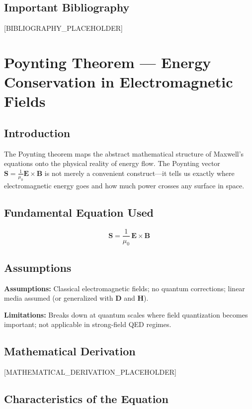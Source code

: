 \documentclass[11pt,openright]{book}
\begin{document}
\section*{Important Bibliography}

[BIBLIOGRAPHY_PLACEHOLDER]


\chapter{Poynting Theorem — Energy Conservation in Electromagnetic Fields}

\section*{Introduction}

The Poynting theorem maps the abstract mathematical structure of Maxwell's equations onto the physical reality of energy flow. The Poynting vector $\mathbf{S} = \frac{1}{\mu_0}\mathbf{E} \times \mathbf{B}$ is not merely a convenient construct---it tells us exactly where electromagnetic energy goes and how much power crosses any surface in space.
\section*{Fundamental Equation Used}

\begin{equation}
\mathbf{S} = \frac{1}{\mu_0}\,\mathbf{E} \times \mathbf{B}
\end{equation}
\section*{Assumptions}

\textbf{Assumptions:} Classical electromagnetic fields; no quantum corrections; linear media assumed (or generalized with $\mathbf{D}$ and $\mathbf{H}$).


\textbf{Limitations:} Breaks down at quantum scales where field quantization becomes important; not applicable in strong-field QED regimes.


\section*{Mathematical Derivation}

[MATHEMATICAL_DERIVATION_PLACEHOLDER]

\section*{Characteristics of the Equation}
\end{document}
